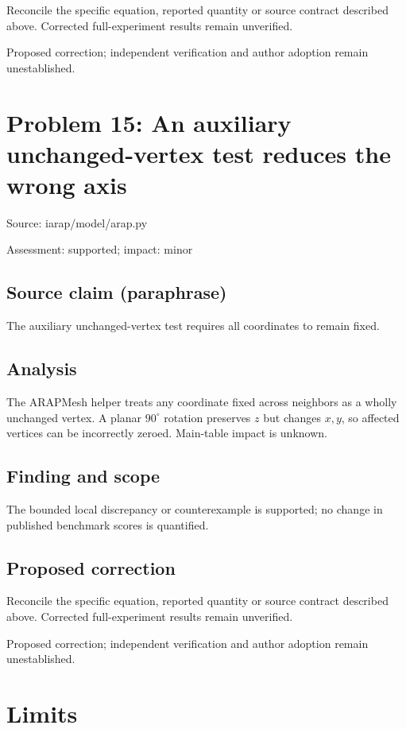 \documentclass[11pt]{article}
\begin{document}
Reconcile the specific equation, reported quantity or source contract described above. Corrected full-experiment results remain unverified.

Proposed correction; independent verification and author adoption remain unestablished.

\section*{Problem 15: An auxiliary unchanged-vertex test reduces the wrong axis}

Source: iarap/model/arap.py

Assessment: supported; impact: minor

\subsection*{Source claim (paraphrase)}

The auxiliary unchanged-vertex test requires all coordinates to remain fixed.

\subsection*{Analysis}

The ARAPMesh helper treats any coordinate fixed across neighbors as a wholly unchanged vertex. A planar \(90^\circ\) rotation preserves \(z\) but changes \(x,y\), so affected vertices can be incorrectly zeroed. Main-table impact is unknown.

\subsection*{Finding and scope}

The bounded local discrepancy or counterexample is supported; no change in published benchmark scores is quantified.

\subsection*{Proposed correction}

Reconcile the specific equation, reported quantity or source contract described above. Corrected full-experiment results remain unverified.

Proposed correction; independent verification and author adoption remain unestablished.

\section*{Limits}
\end{document}
